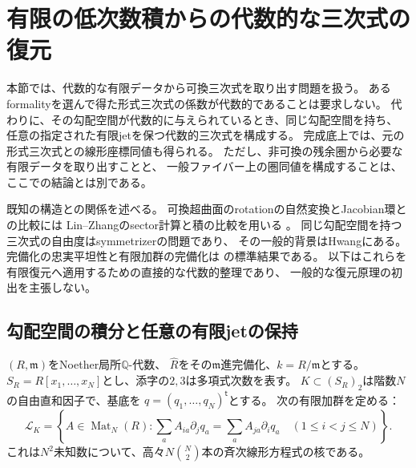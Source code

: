 \section{有限の低次数積からの代数的な三次式の復元}
\label{far:sec:recovery}

本節では、代数的な有限データから可換三次式を取り出す問題を扱う。
あるformalityを選んで得た形式三次式の係数が代数的であることは要求しない。
代わりに、その勾配空間が代数的に与えられているとき、同じ勾配空間を持ち、
任意の指定された有限jetを保つ代数的三次式を構成する。
完成底上では、元の形式三次式との線形座標同値も得られる。
ただし、非可換の残余圏から必要な有限データを取り出すことと、
一般ファイバー上の圏同値を構成することは、ここでの結論とは別である。

既知の構造との関係を述べる。
可換超曲面のrotationの自然変換とJacobian環との比較には
Lin--Zhangのsector計算と積の比較を用いる
\cite[Theorem 3.5, Remark 3.6, Section 5]{FARLinZhang}。
同じ勾配空間を持つ三次式の自由度はsymmetrizerの問題であり、
その一般的背景はHwang\cite{FARHwang}にある。
完備化の忠実平坦性と有限加群の完備化は
\cite[Tags 00MC, 0BNH]{FARStacks}の標準結果である。
以下はこれらを有限復元へ適用するための直接的な代数的整理であり、
一般的な復元原理の初出を主張しない。

\subsection{勾配空間の積分と任意の有限jetの保持}

$(R,\mathfrak m)$をNoether局所$\mathbb Q$-代数、
$\widehat R$をその$\mathfrak m$進完備化、$k=R/\mathfrak m$とする。
$S_R=R[x_1,\ldots,x_N]$とし、添字の$2,3$は多項式次数を表す。
$K\subset (S_R)_2$は階数$N$の自由直和因子で、基底を
$q=(q_1,\ldots,q_N)^{\mathsf t}$とする。
次の有限加群を定める：
\begin{equation}\label{far:eq:linear-kernel}
 \mathcal L_K=\left\{A\in\operatorname{Mat}_N(R):
 \sum_a A_{ia}\partial_jq_a=\sum_a A_{ja}\partial_iq_a
 \quad(1\le i<j\le N)\right\}.
\end{equation}
これは$N^2$未知数について、高々$N\binom N2$本の斉次線形方程式の核である。

